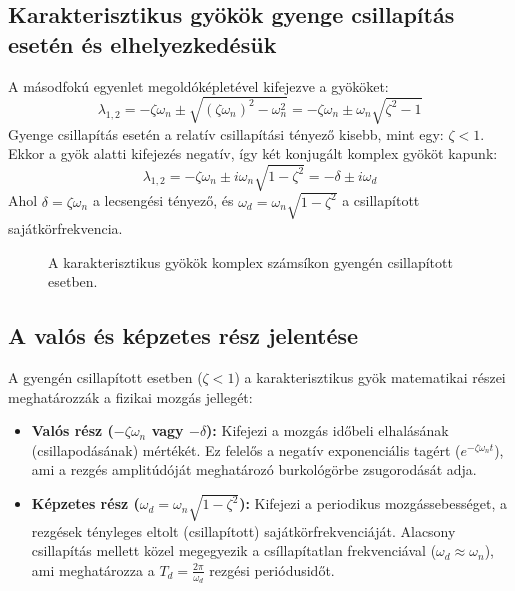 \subsection*{Karakterisztikus gyökök gyenge csillapítás esetén és elhelyezkedésük}
A másodfokú egyenlet megoldóképletével kifejezve a gyököket:
\begin{equation}
    \lambda_{1,2} = -\zeta\omega_n \pm \sqrt{\left(\zeta\omega_n\right)^2 - \omega_n^2} = -\zeta\omega_n \pm \omega_n\sqrt{\zeta^2 - 1}
\end{equation}
Gyenge csillapítás esetén a relatív csillapítási tényező kisebb, mint egy: $\zeta < 1$. Ekkor a gyök alatti kifejezés negatív, így két konjugált komplex gyököt kapunk:
\begin{equation}
    \lambda_{1,2} = -\zeta\omega_n \pm i \omega_n\sqrt{1 - \zeta^2} = -\delta \pm i \omega_d
\end{equation}
Ahol $\delta = \zeta \omega_n$ a lecsengési tényező, és $\omega_d = \omega_n \sqrt{1-\zeta^2}$ a csillapított sajátkörfrekvencia.
\begin{figure}[H]
    \centering
    \caption{A karakterisztikus gyökök komplex számsíkon gyengén csillapított esetben.}
\end{figure}

\subsection*{A valós és képzetes rész jelentése}
A gyengén csillapított esetben ($\zeta < 1$) a karakterisztikus gyök matematikai részei meghatározzák a fizikai mozgás jellegét:
\begin{itemize}
    \item \textbf{Valós rész ($-\zeta\omega_n$ vagy $-\delta$):} Kifejezi a mozgás időbeli elhalásának (csillapodásának) mértékét. Ez felelős a negatív exponenciális tagért ($e^{-\zeta\omega_n t}$), ami a rezgés amplitúdóját meghatározó burkológörbe zsugorodását adja.
    \item \textbf{Képzetes rész ($\omega_d = \omega_n\sqrt{1-\zeta^2}$):} Kifejezi a periodikus mozgássebességet, a rezgések tényleges eltolt (csillapított) sajátkörfrekvenciáját. Alacsony csillapítás mellett közel megegyezik a csíllapítatlan frekvenciával ($\omega_d \approx \omega_n$), ami meghatározza a $T_d = \frac{2\pi}{\omega_d}$ rezgési periódusidőt.
\end{itemize}
